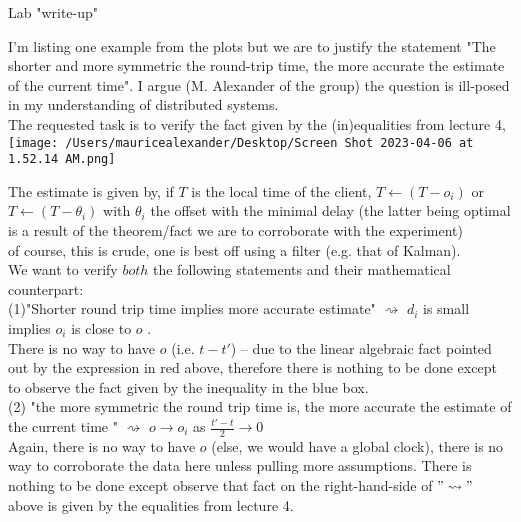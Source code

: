 \documentclass[a4paper,fleqn]{report}
\begin{document}
\hfill Lab "write-up"

I'm listing one example from the plots but we are to justify the statement "The shorter and more symmetric the round-trip time, the more accurate the estimate of the current time". I argue (M. Alexander of the group) the question is ill-posed in my understanding of distributed systems. \\

The requested task is to verify the fact given by the (in)equalities from lecture 4, \\

\hspace{1cm}\texttt{[image: /Users/mauricealexander/Desktop/Screen Shot 2023-04-06 at 1.52.14 AM.png]}

The estimate is given by, if $T$ is the local time of the client, $T\leftarrow (T-o_i)$ or $T\leftarrow (T-\theta_i)$ with $\theta_i$ the offset with the minimal delay (the latter being optimal is a result of the theorem/fact we are to corroborate with the experiment)\\

of course, this is crude, one is best off using a filter (e.g. that of Kalman). \\


We want to verify $both$ the following statements and their mathematical counterpart:\\

\noindent (1)"Shorter round trip time implies more accurate estimate" $\rightsquigarrow$ $d_i$ is small implies $o_i$ is close to $o$ .\\

\noindent  There is no way to have $o$ (i.e. $t-t'$) -- due to the linear algebraic fact pointed out by the expression in red above, therefore there is nothing to be done except to observe the fact given by the inequality in the blue box. \\

\noindent (2) "the more symmetric the round trip time is, the more accurate the estimate of the current time " $\rightsquigarrow$ $o \rightarrow o_i$ as $\frac{t'-t}{2}\rightarrow 0$ \\
\noindent Again, there is no way to have $o$ (else, we would have a global clock), there is no way to corroborate the data here unless pulling more assumptions. There is nothing to be done except observe that fact on the right-hand-side of $"\rightsquigarrow"$ above is given by the equalities from lecture 4. \\
\end{document}
